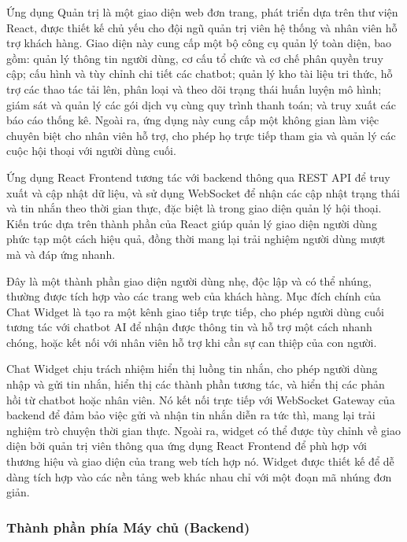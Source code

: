 Ứng dụng Quản trị là một giao diện web đơn trang, phát triển dựa trên thư viện React, được thiết kế chủ yếu cho đội ngũ quản trị viên hệ thống và nhân viên hỗ trợ khách hàng. Giao diện này cung cấp một bộ công cụ quản lý toàn diện, bao gồm: quản lý thông tin người dùng, cơ cấu tổ chức và cơ chế phân quyền truy cập; cấu hình và tùy chỉnh chi tiết các chatbot; quản lý kho tài liệu tri thức, hỗ trợ các thao tác tải lên, phân loại và theo dõi trạng thái huấn luyện mô hình; giám sát và quản lý các gói dịch vụ cùng quy trình thanh toán; và truy xuất các báo cáo thống kê. Ngoài ra, ứng dụng này cung cấp một không gian làm việc chuyên biệt cho nhân viên hỗ trợ, cho phép họ trực tiếp tham gia và quản lý các cuộc hội thoại với người dùng cuối.

Ứng dụng React Frontend tương tác với backend thông qua REST API để truy xuất và cập nhật dữ liệu, và sử dụng WebSocket để nhận các cập nhật trạng thái và tin nhắn theo thời gian thực, đặc biệt là trong giao diện quản lý hội thoại. Kiến trúc dựa trên thành phần của React giúp quản lý giao diện người dùng phức tạp một cách hiệu quả, đồng thời mang lại trải nghiệm người dùng mượt mà và đáp ứng nhanh.

Đây là một thành phần giao diện người dùng nhẹ, độc lập và có thể nhúng, thường được tích hợp vào các trang web của khách hàng. Mục đích chính của Chat Widget là tạo ra một kênh giao tiếp trực tiếp, cho phép người dùng cuối tương tác với chatbot AI để nhận được thông tin và hỗ trợ một cách nhanh chóng, hoặc kết nối với nhân viên hỗ trợ khi cần sự can thiệp của con người.

Chat Widget chịu trách nhiệm hiển thị luồng tin nhắn, cho phép người dùng nhập và gửi tin nhắn, hiển thị các thành phần tương tác, và hiển thị các phản hồi từ chatbot hoặc nhân viên. Nó kết nối trực tiếp với WebSocket Gateway của backend để đảm bảo việc gửi và nhận tin nhắn diễn ra tức thì, mang lại trải nghiệm trò chuyện thời gian thực. Ngoài ra, widget có thể được tùy chỉnh về giao diện bởi quản trị viên thông qua ứng dụng React Frontend để phù hợp với thương hiệu và giao diện của trang web tích hợp nó. Widget được thiết kế để dễ dàng tích hợp vào các nền tảng web khác nhau chỉ với một đoạn mã nhúng đơn giản.

\subsubsection{Thành phần phía Máy chủ (Backend)}

